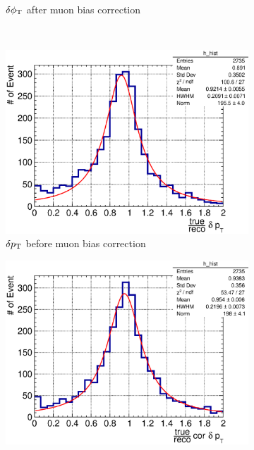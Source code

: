 \begin{figure}
\begin{subfigure}[b]{\dbfigwid\textwidth}
               \caption{$\delta\phi_\textrm{T}$ after muon bias correction}
               \label{subfig:esc-dphit-afmu}
          \end{subfigure}
          \\
          \begin{subfigure}[b]{\dbfigwid\textwidth}
               \centering
               \includegraphics[width=\textwidth]{figures/perf/tki/dpt_rat_hist_al14.eps}
               \caption{$\delta p_\textrm{T}$ before muon bias correction}
               \label{subfig:esc-dpt-bfmu}
          \end{subfigure}
          \begin{subfigure}[b]{\dbfigwid\textwidth}
               \centering
               \includegraphics[width=\textwidth]{figures/perf/tki/cor_dpt_rat_hist_al14.eps}

\end{subfigure}
\end{figure}
